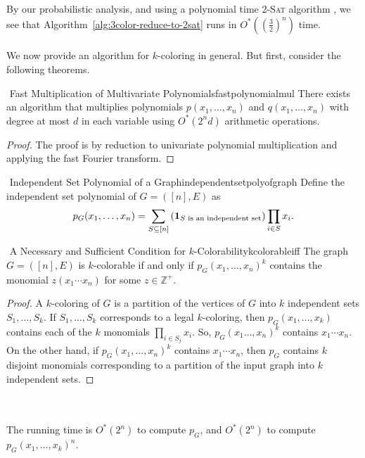         \vphantom
        \\
        \\
        By our probabilistic analysis, and using a polynomial time \textsc{2-Sat} algorithm , we see that Algorithm~\ref{alg:3color-reduce-to-2sat} runs in \(O^*\left(\left(\frac{3}{2}\right)^n\right)\) time.
        \\
        \\
        We now provide an algorithm for \(k\)-coloring in general. But first, consider the following theorems.
        \begin{theorem}{\Stop\,\,Fast Multiplication of Multivariate Polynomials}{fastpolynomialmul}
            There exists an algorithm that multiplies polynomials \(p(x_1,\ldots,x_n)\) and \(q(x_1,\ldots,x_n)\) with degree at most \(d\) in each variable using \(O^*(2^nd)\) arithmetic operations.
            \begin{proof}
                The proof is by reduction to univariate polynomial multiplication and applying the fast Fourier transform.
            \end{proof}
        \end{theorem}
        \begin{definition}{\Stop\,\,Independent Set Polynomial of a Graph}{independentsetpolyofgraph}
            Define the independent set polynomial of \(G=([n],E)\) as
            \begin{equation*}
                p_G(x_1,\ldots,x_n)=\sum_{S\subseteq[n]}\left(\mathbf{1}_{S\text{ is an independent set}}\right)\prod_{i\in S}x_i.
            \end{equation*}
        \end{definition}
        \begin{theorem}{\Stop\,\,A Necessary and Sufficient Condition for \(k\)-Colorability}{kcolorableiff}
            The graph \(G=([n],E)\) is \(k\)-colorable if and only if \(p_G(x_1,\ldots,x_n)^k\) contains the monomial \(z(x_1\cdots x_n)\) for some \(z\in\mathbb{Z}^+\).
            \begin{proof}
                A \(k\)-coloring of \(G\) is a partition of the vertices of \(G\) into \(k\) independent sets \(S_1,\ldots,S_k\). If \(S_1,\ldots,S_k\) corresponds to a legal \(k\)-coloring, then \(p_G(x_1,\ldots,x_k)\) contains each of the \(k\) monomials \(\prod_{i\in S_j}x_i\). So, \(p_G(x_1\ldots,x_n)^k\) contains \(x_1\cdots x_n\). On the other hand, if \(p_G(x_1,\ldots,x_n)^k\) contains \(x_1\cdots x_n\), then \(p_G\) contains \(k\) disjoint monomials corresponding to a partition of the input graph into \(k\) independent sets.
            \end{proof}
        \end{theorem}
        \vphantom
        \\
        \\
        The running time is \(O^*(2^n)\) to compute \(p_G\), and \(O^*(2^n)\) to compute \(p_G(x_1,\ldots,x_k)^n\). 

